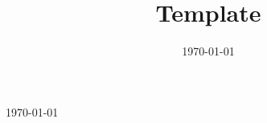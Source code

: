 \documentclass{amsart}
\title[Short title]{Template}
\date{\today}
\begin{document}
	\today
%	
%	
%	
	
	\printbibliography
\end{document}
